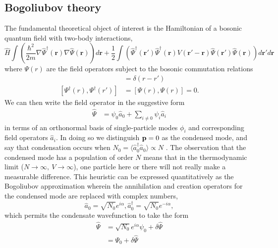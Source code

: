 \subsection*{Bogoliubov theory}
	The fundamental theoretical object of interest is the Hamiltonian of a bosonic quantum field with two-body interactions,
	\begin{equation}
		\hat{H} \int\left(\frac{\hbar^2}{2m}\nabla\hat{\Psi}^\dagger(\textbf{r})\nabla\hat{\Psi}(\textbf{r})\right)d\textbf{r} + \frac{1}{2}\int\left(\hat{\Psi}^\dagger(\textbf{r}')\hat{\Psi}^\dagger(\textbf{r})V(\textbf{r}'-\textbf{r}) \hat{\Psi}(\textbf{r}')\hat{\Psi}(\textbf{r})\right)d\textbf{r}'d\textbf{r}
		\label{eqn:ham}
	\end{equation}
	where $\Psi(r)$ are the field operators subject to the bosonic commutation relations
	\begin{align}
		[\Psi(r),\Psi^\dagger(r')] &= \delta(r-r')\\
		 [\Psi^\dagger(r),\Psi^\dagger(r')]&=[\Psi(r),\Psi(r)]=0.
	\end{align}	
	We can then write the field operator in the suggestive form	
	\begin{align}
		\hat{\Psi} &= \psi_0 \hat{a}_0 + \sum_{i\neq0}\psi_i \hat{a}_i
	\end{align}
	in terms of an orthonormal basis of single-particle modes $\phi_i$ and corresponding field operators $\hat{a}_i$. In doing so we distinguish $\textbf{p}=0$ as the condensed mode, and say that condensation occurs when $N_0=\langle\hat{a}^\dagger_0\hat{a}_0\rangle \propto N$ . The observation that the condensed mode has a population of order $N$ means that in the thermodynamic limit ($N\rightarrow\infty,~V\rightarrow\infty$), one particle here or there will not really make a measurable difference. This heuristic can be expressed quantitatively as the Bogoliubov approximation wherein the annihilation and creation operators for the condensed mode are replaced with complex numbers,
	\begin{equation}
		\hat{a}_0 = \sqrt{N_0}e^{i\alpha}, \hat{a}_0^\dagger= \sqrt{N_0}e^{-i\alpha}, 
	\end{equation}
	which permits the condensate wavefunction to take the form
	\begin{align}
		\hat{\Psi} &= \sqrt{N_0}e^{i\alpha} \psi_0 + \delta\hat{\Psi}\\
					&= \Psi_0 + \delta\hat{\Psi}
	\end{align}


